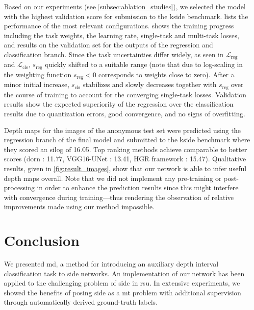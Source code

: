 \documentclass[lang=english]{tumarxivarticle}
\newcommand{\citep}{\parencite}
\newcommand{\loss}{\ensuremath{\mathcal{L}}}
\begin{document}
Based on our experiments (see \cref{subsec:ablation_studies}), we selected the model with the highest validation score for submission to the \gls{kside} benchmark.
 lists the performance of the most relevant configurations.
 shows the training progress including the task weights, the learning rate, single-task and multi-task losses, and results on the validation set for the outputs of the regression and classification branch.
Since the task uncertainties differ widely, as seen in $\loss_\text{reg}$ and $\loss_\text{cls}$, $s_\text{reg}$ quickly shifted to a suitable range (note that due to log-scaling in the weighting function $s_\text{reg} < 0$ corresponds to weights close to zero).
After a minor initial increase, $s_\text{cls}$ stabilizes and slowly decreases together with $s_\text{reg}$ over the course of training to account for the converging single-task losses.
Validation results show the expected superiority of the regression over the classification results due to quantization errors, good convergence, and no signs of overfitting.

Depth maps for the images of the anonymous test set were predicted using the regression branch of the final model and submitted to the \gls{kside} benchmark where they scored an \gls{silog} of \num{16.05}.
Top ranking methods achieve comparable to better scores (\gls{dorn} \citep{Fu18}: \num{11.77}, VGG16-UNet \citep{Guo18b}: \num{13.41}, HGR framework \citep{Zhang18b}: \num{15.47}).
Qualitative results, given in \cref{fig:result_images}, show that our network is able to infer useful depth maps overall.
Note that we did not implement any pre-training or post-processing in order to enhance the prediction results since this might interfere with convergence during training---thus rendering the observation of relative improvements made using our method impossible.


\section{Conclusion}

We presented \gls{md}, a method for introducing an auxiliary depth interval classification task to \gls{side} networks.
An implementation of our network has been applied to the challenging problem of \gls{side} in \gls{rsu}.
In extensive experiments, we showed the benefits of posing \gls{side} as a \gls{mt} problem with additional supervision through automatically derived ground-truth labels.
\end{document}
